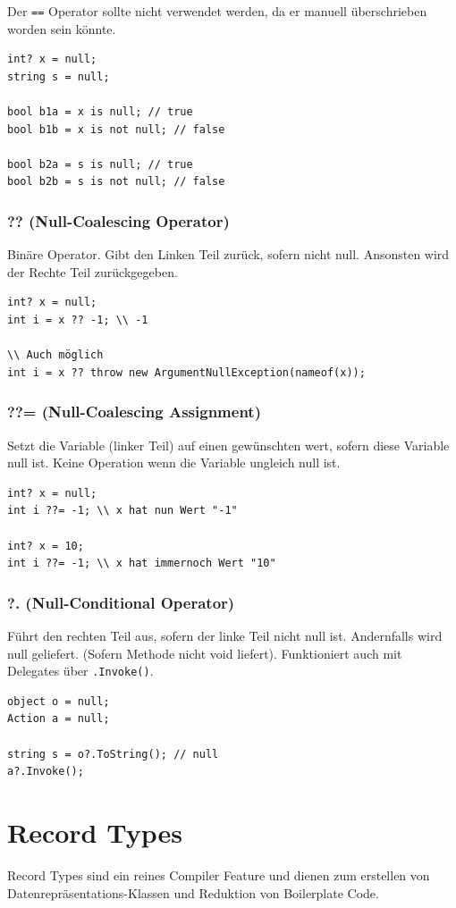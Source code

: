 \documentclass[
a4paper,
oneside,
10pt,
fleqn,
headsepline,
toc=listofnumbered, 
bibliography=totocnumbered]{scrartcl}
\let\stdsection\section
\renewcommand\section{\clearpage\stdsection}
\begin{document}
Der \lstinline|==| Operator sollte nicht verwendet werden, da er manuell überschrieben worden sein könnte.
\begin{lstlisting}
int? x = null;
string s = null;

bool b1a = x is null; // true
bool b1b = x is not null; // false
	
bool b2a = s is null; // true
bool b2b = s is not null; // false
\end{lstlisting}

\subsubsection{?? (Null-Coalescing Operator)}
Binäre Operator. Gibt den Linken Teil zurück, sofern nicht null. Ansonsten wird der Rechte Teil zurückgegeben.
\begin{lstlisting}
int? x = null;
int i = x ?? -1; \\ -1

\\ Auch möglich
int i = x ?? throw new ArgumentNullException(nameof(x));
\end{lstlisting}
\subsubsection{??= (Null-Coalescing Assignment)}
Setzt die Variable (linker Teil) auf einen gewünschten wert, sofern diese Variable null ist. Keine Operation wenn die Variable ungleich null ist.
\begin{lstlisting}
int? x = null;
int i ??= -1; \\ x hat nun Wert "-1"

int? x = 10;
int i ??= -1; \\ x hat immernoch Wert "10"
\end{lstlisting}

\subsubsection{?. (Null-Conditional Operator)}
Führt den rechten Teil aus, sofern der linke Teil nicht null ist. Andernfalls wird null geliefert. (Sofern Methode nicht void liefert). Funktioniert auch mit Delegates über \lstinline|.Invoke()|.
\begin{lstlisting}
object o = null;
Action a = null;

string s = o?.ToString(); // null
a?.Invoke();
\end{lstlisting}

\section{Record Types}
Record Types sind ein reines Compiler Feature und dienen zum erstellen von Datenrepräsentations-Klassen und Reduktion von Boilerplate Code.
\end{document}
